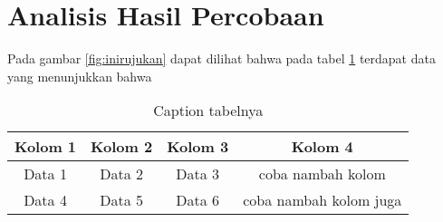 \section*{Analisis Hasil Percobaan}
\indent
Pada gambar \ref{fig:inirujukan} dapat dilihat bahwa pada tabel \ref{tab:labelini} terdapat data yang menunjukkan bahwa \lipsum[1]
\lipsum[1-2]

\begin{table}[h]
    \centering
    \caption{Caption tabelnya}
    \label{tab:labelini}
    \begin{tabular}{|c|c|c|c|}
    \hline
    Kolom 1 & Kolom 2 & Kolom 3 & Kolom 4 \\
    \hline
    Data 1 & Data 2 & Data 3 & coba nambah kolom \\
    Data 4 & Data 5 & Data 6 & coba nambah kolom juga \\ 
    \hline
    \end{tabular}
\end{table}